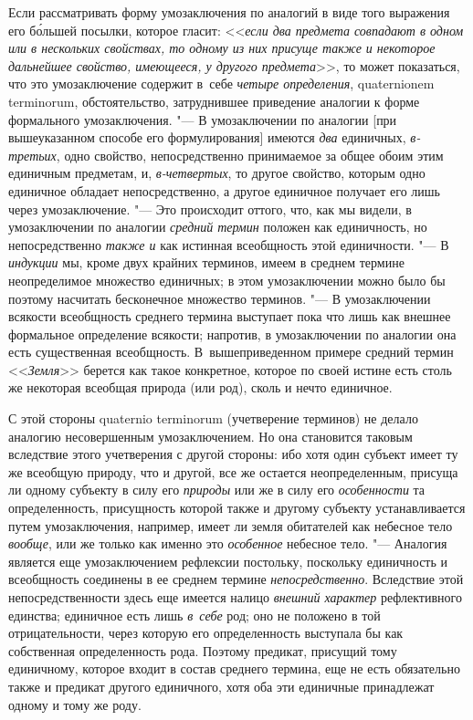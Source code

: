 Если рассматривать форму умозаключения по аналогий в виде того
выражения его б\'{о}льшей посылки, которое гласит:
<<{\em если два предмета совпадают в
одном или в нескольких свойствах, то одному из них присуще также и
некоторое дальнейшее свойство, имеющееся, у другого предмета}>>,
то может показаться, что это умозаключение содержит в~себе
{\em четыре определения}, quaterni\-onem
termi\-norum, обстоятельство, затруднившее приведение аналогии
к форме формального умозаключения. "--- В умозаключении по
аналогии [при вышеуказанном способе его формулирования] имеются
{\em два} единичных,
{\em в-третьих}, одно
свойство, непосредственно принимаемое за общее обоим этим единичным
предметам, и, {\em в-четвертых},
то другое свойство, которым одно единичное обладает
непосредственно, а другое единичное получает его лишь через умозаключение.
"--- Это происходит оттого, что, как мы видели, в умозаключении
по аналогии {\em средний термин}
положен как единичность, но непосредственно
{\em также и} как
истинная всеобщность этой единичности. "--- В
{\em индукции} мы, кроме
двух крайних терминов, имеем в среднем термине неопределимое множество
единичных; в этом умозаключении можно было бы поэтому насчитать бесконечное
множество терминов. "--- В умозаключении всякости всеобщность
среднего термина выступает пока что лишь как внешнее формальное определение
всякости; напротив, в умозаключении по аналогии она есть существенная
всеобщность. В~вышеприведенном примере средний термин
<<{\em Земля}>> берется как
такое конкретное, которое по своей истине есть столь же некоторая всеобщая
природа (или род), сколь и нечто единичное.

С этой стороны quaternio terminorum
(учетверение терминов) не делало аналогию несовершенным
умозаключением. Но она становится таковым вследствие этого учетверения с
другой стороны: ибо хотя один субъект имеет ту же всеобщую природу, что и
другой, все же остается неопределенным, присуща ли одному субъекту в силу
его {\em природы} или же
в силу его {\em особенности}
та определенность, присущность которой также и другому
субъекту устанавливается путем умозаключения, например, имеет ли земля
обитателей как небесное тело
{\em вообще}, или же
только как именно это {\em особенное}
небесное тело. "--- Аналогия является еще
умозаключением рефлексии постольку, поскольку единичность и всеобщность
соединены в ее среднем термине
{\em непосредственно}.
Вследствие этой непосредственности здесь еще имеется налицо
{\em внешний характер}
рефлективного единства; единичное есть лишь
{\em в~себе} род; оно не
положено в той отрицательности, через которую его определенность выступала
бы как собственная определенность рода. Поэтому предикат, присущий тому
единичному, которое входит в состав среднего термина, еще не есть
обязательно также и предикат другого единичного, хотя оба эти единичные
принадлежат одному и тому же роду.

